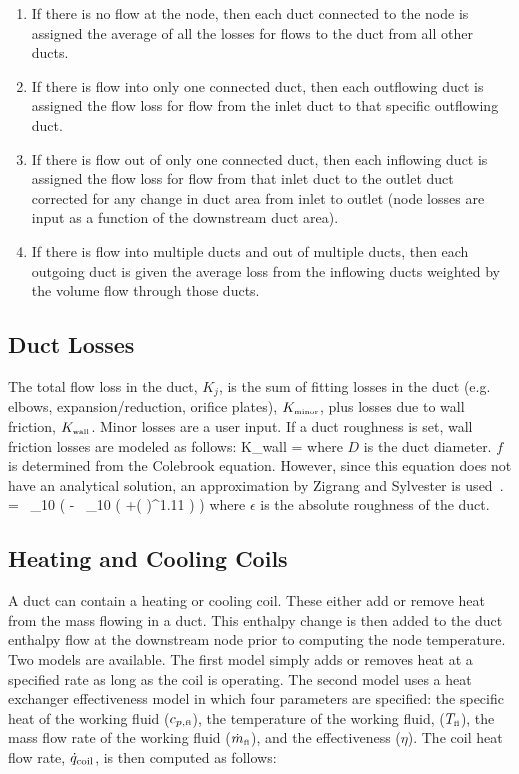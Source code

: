 \begin{enumerate}
\item If there is no flow at the node, then each duct connected to the node is assigned the average of all the losses for flows to the duct from all other ducts.
\item If there is flow into only one connected duct, then each outflowing duct is assigned the flow loss for flow from the inlet duct to that specific outflowing duct.
\item If there is flow out of only one connected duct, then each inflowing duct is assigned the flow loss for flow from that inlet duct to the outlet duct corrected for any change in duct area from inlet to outlet (node losses are input as a function of the downstream duct area).
\item If there is flow into multiple ducts and out of multiple ducts, then each outgoing duct is given the average loss from the inflowing ducts weighted by the volume flow through those ducts.
\end{enumerate}

\subsection{Duct Losses}

The total flow loss in the duct, $K_j$, is the sum of fitting losses in the duct (e.g. elbows, expansion/reduction, orifice plates), $K_{\mbox{\tiny minor}}$, plus losses due to wall friction, $K_{\mbox{\tiny wall}}$.  Minor losses are a user input. If a duct roughness is set, wall friction losses are modeled as follows:
\be 
   K_{\mbox{\tiny wall}} =  
\ee
where $D$ is the duct diameter.  $f$ is determined from the Colebrook equation. However, since this equation does not have an analytical solution, an approximation by Zigrang and Sylvester is used~\cite{Zigrang:1}.
\be 
    \; =  \, \log_{10} \left(\; - \;  \, \log_{10} \left( +\left(  \right)^{1.11} \right) \right) 
\ee
where $\epsilon$ is the absolute roughness of the duct.

\subsection{Heating and Cooling Coils}

A duct can contain a heating or cooling coil.  These either add or remove heat from the mass flowing in a duct.  This enthalpy change is then added to the duct enthalpy flow at the downstream node prior to computing the node temperature.  Two models are available.  The first model simply adds or removes heat at a specified rate as long as the coil is operating.  The second model uses a heat exchanger effectiveness model in which four parameters are specified: the specific heat of the working fluid ($c_{p,\text{\tiny fl}}$), the temperature of the working fluid, ($T_\text{\tiny fl}$), the mass flow rate of the working fluid ($\dot{m}_\text{\tiny fl}$), and the effectiveness ($\eta$).  The coil heat flow rate, $\dot{q}_{\rm coil}$, is then computed as follows:

